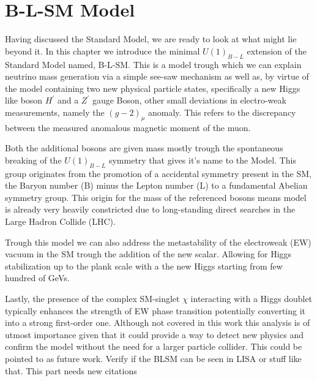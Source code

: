 
\newpage 

% 
% 
% 

\section{B-L-SM Model}


Having discussed the Standard Model, we are ready to look at what might lie beyond it. In this chapter we introduce the minimal $U(1)_{B-L}$ extension of the Standard Model named, B-L-SM. This is a model trough which we can explain neutrino mass generation via a simple see-saw mechanism as well as, by virtue of the model containing two new physical particle states, specifically a new Higgs like boson $H^\prime$ and a $Z^\prime$ gauge Boson, other small deviations in electro-weak measurements, namely the $(g-2)_\mu$ anomaly. This refers to the discrepancy between the measured anomalous magnetic moment of the muon. 

Both the additional bosons are given mass mostly trough the spontaneous breaking of the $U(1)_{B-L}$ symmetry that gives it's name to the Model. This group originates from the promotion of a accidental symmetry present in the SM, the Baryon number (B) minus the Lepton number (L) to a fundamental Abelian symmetry group. This origin for the mass of the referenced bosons means model is already very heavily constricted due to long-standing direct searches in the Large Hadron Collide (LHC). 

Trough this model we can also address the metastability of the electroweak (EW) vacuum in the SM trough the addition of the new scalar. Allowing for Higgs stabilization up to the plank scale with a the new Higgs starting from few hundred of GeVs. 

Lastly, the presence of the complex SM-singlet $\chi$ interacting with a Higgs doublet typically enhances the strength of EW phase transition potentially converting it into a strong first-order one. Although not covered in this work this analysis is of utmost importance given that it could provide a way to detect new physics and confirm the model without the need for a larger particle collider. This could be pointed to as future work. { \color{red} Verify if the BLSM can be seen in LISA or stuff like that. This part needs new citations }

